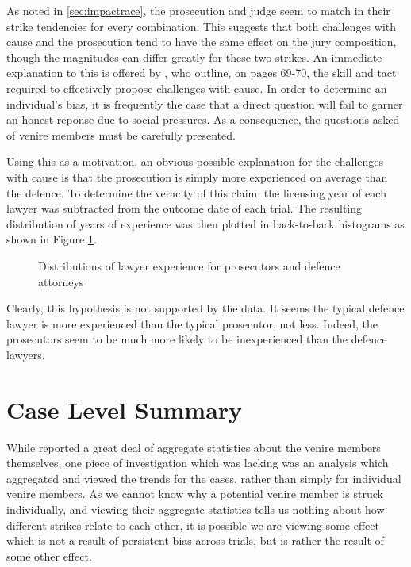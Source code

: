 As noted in \ref{sec:impactrace}, the prosecution and judge seem to match in their strike tendencies for every combination. This
suggests that both challenges with cause and the prosecution tend to have the same effect on the jury composition, though the
magnitudes can differ greatly for these two strikes. An immediate explanation to this is offered by \cite{hansvidjudging}, who
outline, on pages 69-70, the skill and tact required to effectively propose challenges with cause. In order to determine an
individual's bias, it is frequently the case that a direct question will fail to garner an honest reponse due to social pressures.
As a consequence, the questions asked of venire members must be carefully presented.

Using this as a motivation, an obvious possible explanation for the challenges with cause is that the prosecution is simply more
experienced on average than the defence. To determine the veracity of this claim, the licensing year of each lawyer was subtracted
from the outcome date of each trial. The resulting distribution of years of experience was then plotted in back-to-back histograms
as shown in Figure \ref{fig:lawyerexp}.

\begin{figure}[h!]
  \caption[Lawyer Experience (Sunshine)]
  {Distributions of lawyer experience for prosecutors and defence attorneys}
  \label{fig:lawyerexp}
\end{figure}

Clearly, this hypothesis is not supported by the data. It seems the typical defence lawyer is more experienced than the typical
prosecutor, not less. Indeed, the prosecutors seem to be much more likely to be inexperienced than the defence lawyers.
  
\section{Case Level Summary} \label{sec:casesum}

While \cite{JurySunshineProj} reported a great deal of aggregate statistics about the venire members themselves, one piece of
investigation which was lacking was an analysis which aggregated and viewed the trends for the cases, rather than simply for
individual venire members. As we cannot know why a potential venire member is struck individually, and viewing their aggregate
statistics tells us nothing about how different strikes relate to each other, it is possible we are viewing some effect which is
not a result of persistent bias across trials, but is rather the result of some other effect.

